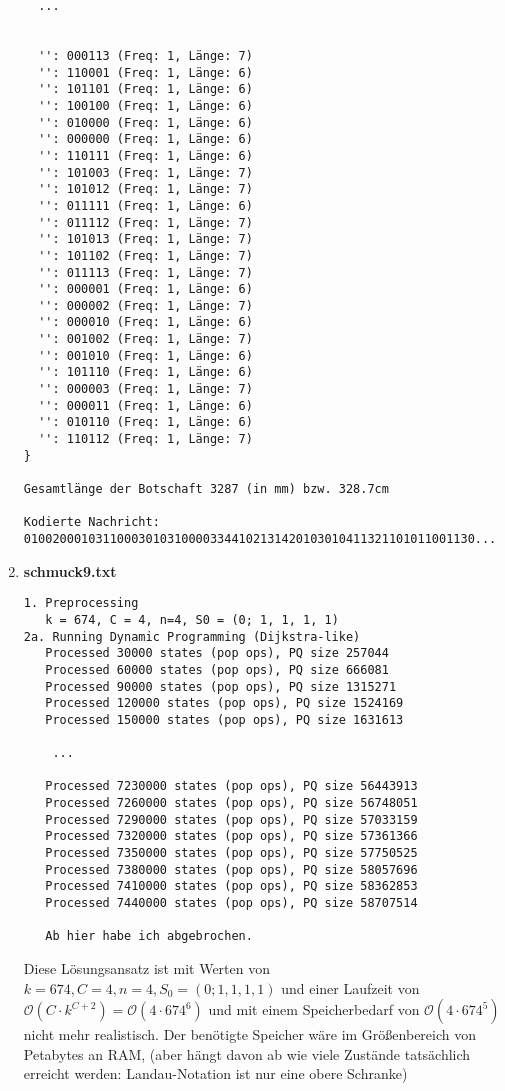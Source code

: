 \documentclass[a4paper,10pt,ngerman]{scrartcl}
\begin{document}
\begin{enumerate}
\begin{verbatim}
  ...

 
  '': 000113 (Freq: 1, Länge: 7)
  '': 110001 (Freq: 1, Länge: 6)
  '': 101101 (Freq: 1, Länge: 6)
  '': 100100 (Freq: 1, Länge: 6)
  '': 010000 (Freq: 1, Länge: 6)
  '': 000000 (Freq: 1, Länge: 6)
  '': 110111 (Freq: 1, Länge: 6)
  '': 101003 (Freq: 1, Länge: 7)
  '': 101012 (Freq: 1, Länge: 7)
  '': 011111 (Freq: 1, Länge: 6)
  '': 011112 (Freq: 1, Länge: 7)
  '': 101013 (Freq: 1, Länge: 7)
  '': 101102 (Freq: 1, Länge: 7)
  '': 011113 (Freq: 1, Länge: 7)
  '': 000001 (Freq: 1, Länge: 6)
  '': 000002 (Freq: 1, Länge: 7)
  '': 000010 (Freq: 1, Länge: 6)
  '': 001002 (Freq: 1, Länge: 7)
  '': 001010 (Freq: 1, Länge: 6)
  '': 101110 (Freq: 1, Länge: 6)
  '': 000003 (Freq: 1, Länge: 7)
  '': 000011 (Freq: 1, Länge: 6)
  '': 010110 (Freq: 1, Länge: 6)
  '': 110112 (Freq: 1, Länge: 7)
}

Gesamtlänge der Botschaft 3287 (in mm) bzw. 328.7cm

Kodierte Nachricht: 010020001031100030103100003344102131420103010411321101011001130...
\end{verbatim}
\item \textbf{schmuck9.txt}

\begin{verbatim}
1. Preprocessing
   k = 674, C = 4, n=4, S0 = (0; 1, 1, 1, 1)
2a. Running Dynamic Programming (Dijkstra-like)
   Processed 30000 states (pop ops), PQ size 257044
   Processed 60000 states (pop ops), PQ size 666081
   Processed 90000 states (pop ops), PQ size 1315271
   Processed 120000 states (pop ops), PQ size 1524169
   Processed 150000 states (pop ops), PQ size 1631613

    ...

   Processed 7230000 states (pop ops), PQ size 56443913
   Processed 7260000 states (pop ops), PQ size 56748051
   Processed 7290000 states (pop ops), PQ size 57033159
   Processed 7320000 states (pop ops), PQ size 57361366
   Processed 7350000 states (pop ops), PQ size 57750525
   Processed 7380000 states (pop ops), PQ size 58057696
   Processed 7410000 states (pop ops), PQ size 58362853
   Processed 7440000 states (pop ops), PQ size 58707514

   Ab hier habe ich abgebrochen. 
\end{verbatim}
Diese Lösungsansatz ist mit Werten von $k = 674, C = 4, n=4, S_0 = (0; 1, 1, 1, 1)$ und einer Laufzeit von $\mathcal{O}(C\cdot k^{C+2})=\mathcal{O}(4\cdot674^{6})$ und mit einem Speicherbedarf von $\mathcal{O}(4\cdot 674^{5})$ nicht mehr realistisch. Der benötigte Speicher wäre im Größenbereich von Petabytes an RAM, (aber hängt davon ab wie viele Zustände tatsächlich erreicht werden: Landau-Notation ist nur eine obere Schranke)
\end{enumerate}
\end{document}
